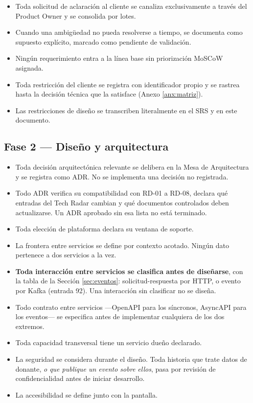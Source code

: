\documentclass[11pt,a4paper]{article}
\begin{document}
\begin{itemize}
\item Toda solicitud de aclaración al cliente se canaliza exclusivamente a través del Product Owner y se consolida por lotes.
\item Cuando una ambigüedad no pueda resolverse a tiempo, se documenta como supuesto explícito, marcado como pendiente de validación.
\item Ningún requerimiento entra a la línea base sin priorización MoSCoW asignada.
\item Toda restricción del cliente se registra con identificador propio y se rastrea hasta la decisión técnica que la satisface (Anexo \ref{anx:matriz}).
\item Las restricciones de diseño se transcriben literalmente en el SRS y en este documento.
\end{itemize}

\subsection{Fase 2 — Diseño y arquitectura}

\begin{itemize}
\item Toda decisión arquitectónica relevante se delibera en la Mesa de Arquitectura y se registra como ADR. No se implementa una decisión no registrada.
\item Todo ADR verifica su compatibilidad con RD-01 a RD-08, declara qué entradas del Tech Radar cambian y qué documentos controlados deben actualizarse. Un ADR aprobado sin esa lista no está terminado.
\item Toda elección de plataforma declara su ventana de soporte.
\item La frontera entre servicios se define por contexto acotado. Ningún dato pertenece a dos servicios a la vez.
\item \textbf{Toda interacción entre servicios se clasifica antes de diseñarse}, con la tabla de la Sección \ref{sec:eventos}: solicitud-respuesta por HTTP, o evento por Kafka (entrada 92). Una interacción sin clasificar no se diseña.
\item Todo contrato entre servicios ---OpenAPI para los síncronos, AsyncAPI para los eventos--- se especifica antes de implementar cualquiera de los dos extremos.
\item Toda capacidad transversal tiene un servicio dueño declarado.
\item La seguridad se considera durante el diseño. Toda historia que trate datos de donante, \emph{o que publique un evento sobre ellos}, pasa por revisión de confidencialidad antes de iniciar desarrollo.
\item La accesibilidad se define junto con la pantalla.
\end{itemize}
\end{document}
